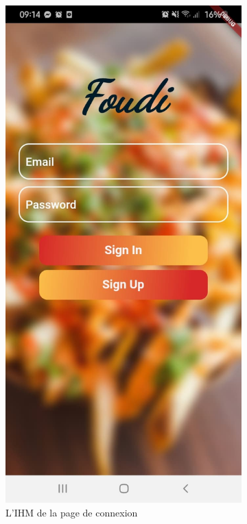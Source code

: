 \documentclass[french, a4paper, 12pt]{report}
\begin{document}
\begin{figure}[h!]
\centering
\begin{subfigure}{.5\textwidth}
  \centering
  \includegraphics[width=.9\linewidth]{screenshots/signin.jpg}
  \caption{L'IHM de la page de connexion}
  \label{fig:signin}
\end{subfigure}%
\begin{subfigure}{.5\textwidth}

\end{subfigure}
\end{figure}
\end{document}
